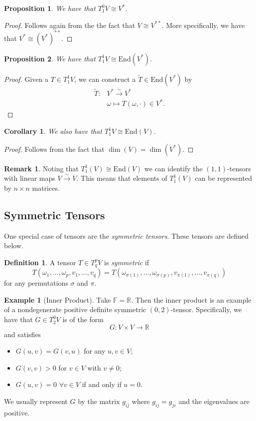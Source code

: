\documentclass[12pt]{article}
\newcommand{\R}{\mathbb{R}}
\newcommand{\field}{\mathbb{F}}
\newcommand{\linmap}{\overset{\sim}{\longrightarrow}}
\newcommand{\End}{\mathrm{End}}
\newcommand{\tspace}{T_q^pV}
\newtheorem{proposition}{Proposition}[section]
\newtheorem{corollary}{Corollary}[section]
\theoremstyle{definition}
\newtheorem{definition}{Definition}[section]
\newtheorem{example}{Example}[section]
\newtheorem{remark}{Remark}[section]
\begin{document}
\begin{proposition}
We have that $T_1^0V\cong V^*$.
\end{proposition}
\begin{proof}
Follows again from the the fact that $V\cong V^{**}$.  More specifically, we have that $V^*\cong (V^*)^{**}$.
\end{proof}

\begin{proposition}
We have that $T_1^1V\cong \End(V^*)$.
\end{proposition}
\begin{proof}
Given a $T\in T_1^1V$, we can construct a $\tilde{T}\in \End(V^*)$ by
\begin{align*}
\tilde{T}\colon& V^* \linmap V^*\\
&\omega \mapsto T(\omega,\cdot)\in V^*.
\end{align*}
\end{proof}

\begin{corollary}
We also have that $T_1^1V\cong \End(V)$.
\end{corollary}
\begin{proof}
Follows from the fact that $\dim(V)=\dim(V^*)$.
\end{proof}

\begin{remark}
Noting that $T_1^1(V)\cong \End(V)$ we can identify the $(1,1)$-tensors with linear maps $V\linmap V$.  This means that elements of $T_1^1(V)$ can be represented by $n\times n$ matrices.
\end{remark}

\subsection{Symmetric Tensors}
One special case of tensors are the \emph{symmetric tensors}.  These tensors are defined below.

\begin{definition}
A tensor $T\in \tspace$ is \emph{symmetric} if 
\[
T(\omega_1,\dots ,\omega_p,v_1,\dots,v_q)=T(\omega_{\sigma(1)},\dots,\omega_{\sigma(p)},v_{\pi(1)},\dots,v_{\pi(q)})
\]
for any permutations $\sigma$ and $\pi$.
\end{definition}

\begin{example}[Inner Product]
Take $\field=\R$. Then the inner product is an example of a nondegenerate positive definite symmetric $(0,2)$-tensor.  Specifically, we have that $G\in T_2^0V$ is of the form
\[
G\colon V\times V \to \R
\]
and satisfies
\begin{itemize}
    \item $G(u,v)=G(v,u)$ for any $u,v\in V$;
    \item $G(v,v)>0$ for $v\in V$ with $v\neq 0$;
    \item $G(u,v)=0$ $\forall v \in V$ if and only if $u=0$.
\end{itemize}
We usually represent $G$ by the matrix $g_{ij}$ where $g_{ij}=g_{ji}$ and the eigenvalues are positive.
\end{example}
\end{document}
